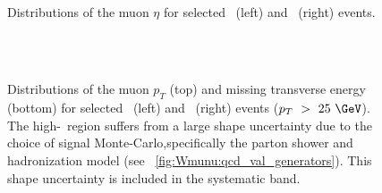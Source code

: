 \begin{figure}[phtb]
  \begin{center}
        \\
 \caption{ Distributions of the muon $\eta$ for selected \Wmunup~(left) and \Wmunum~(right) events. }
 \label{fig:Wmunu:mu_angle25}
 \end{center}
\end{figure}

\begin{figure}[phtb]
  \begin{center}
        \\
        \\
 \caption{ Distributions of the muon $p_{T}$ (top) and missing transverse energy (bottom) for selected \Wmunup~(left) and \Wmunum~(right) events ($p_{T}~>~25~\GeV$). The high-\MET\ region suffers from a large shape uncertainty due to the choice of signal Monte-Carlo,specifically the parton shower and hadronization model (see \Fig~\ref{fig:Wmunu:qcd_val_generators}). This shape uncertainty is included in the systematic band. }
 \label{fig:Wmunu:mu_kine25}
 \end{center}
\end{figure}


